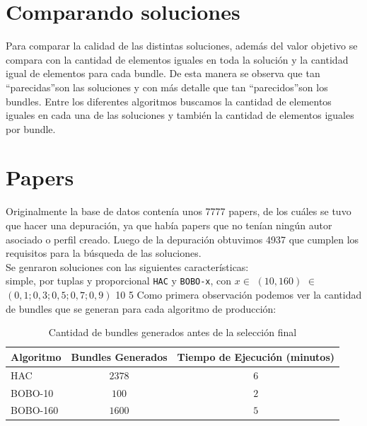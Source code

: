 \section{Comparando soluciones}
Para comparar la calidad de las distintas soluciones, además del valor objetivo se compara con 
la cantidad de elementos iguales en toda la solución y la cantidad igual de elementos para cada 
bundle. De esta manera se observa que tan \textquotedblleft parecidas\textquotedblright son las 
soluciones y con más detalle que tan \textquotedblleft parecidos\textquotedblright son los bundles. 
Entre los diferentes algoritmos buscamos la cantidad de elementos iguales en cada una de las 
soluciones y también la cantidad de elementos iguales por bundle.
\section{Papers}
Originalmente la base de datos contenía unos 7777 papers, de los cuáles se tuvo que hacer una 
depuración, ya que había papers que no tenían ningún autor asociado o perfil creado. Luego de la 
depuración obtuvimos 4937 que cumplen los requisitos para la búsqueda de las soluciones.\\
Se genraron soluciones con las siguientes características:\\
\Solucion
{}
{simple, por tuplas y proporcional}
{\texttt{HAC} y \texttt{BOBO-x}, con  $x \in$ $(10, 160)$}
{$\in$ $(0,1; 0,3; 0,5; 0,7; 0,9)$}
{10}
{5}
Como primera observación podemos ver la cantidad de bundles que se generan para cada algoritmo de 
producción:\\
\begin{table}[h]
  \centering
  \resizebox{\textwidth}{!} {
    \begin{tabular}{|lcc|}
    \hline
    Algoritmo & Bundles Generados & Tiempo de Ejecución (minutos) \\
    \hline
    HAC       & $2378$ & $6$ \\
    BOBO-10   & $100$  & $2$ \\
    BOBO-160  & $1600$ & $5$ \\
    \hline
    \end{tabular}
  }
    \caption {Cantidad de bundles generados antes de la selección final}
\end{table}


